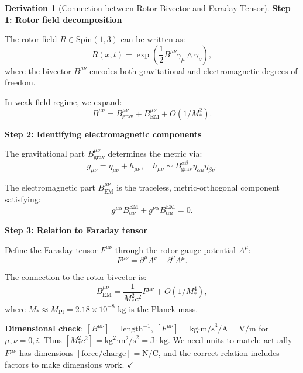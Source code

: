 \documentclass[12pt,a4paper]{article}
\theoremstyle{definition}
\newtheorem{derivation}{Derivation}[section]
\theoremstyle{remark}
\begin{document}
\begin{derivation}[Connection between Rotor Bivector and Faraday Tensor]

\textbf{Step 1: Rotor field decomposition}

The rotor field $R \in \mathrm{Spin}(1,3)$ can be written as:
\begin{equation}
R(x,t) = \exp\left(\frac{1}{2} B^{\mu\nu} \gamma_\mu \wedge \gamma_\nu\right),
\end{equation}
where the bivector $B^{\mu\nu}$ encodes both gravitational and electromagnetic degrees of freedom.

In weak-field regime, we expand:
\begin{equation}
B^{\mu\nu} = B^{\mu\nu}_{\text{grav}} + B^{\mu\nu}_{\text{EM}} + O(1/M_*^2).
\end{equation}

\textbf{Step 2: Identifying electromagnetic components}

The gravitational part $B^{\mu\nu}_{\text{grav}}$ determines the metric via:
\begin{equation}
g_{\mu\nu} = \eta_{\mu\nu} + h_{\mu\nu}, \quad h_{\mu\nu} \sim B^{\alpha\beta}_{\text{grav}} \eta_{\alpha\mu} \eta_{\beta\nu}.
\end{equation}

The electromagnetic part $B^{\mu\nu}_{\text{EM}}$ is the traceless, metric-orthogonal component satisfying:
\begin{equation}
g^{\mu\alpha} B^{\text{EM}}_{\alpha\nu} + g^{\nu\alpha} B^{\text{EM}}_{\alpha\mu} = 0.
\end{equation}

\textbf{Step 3: Relation to Faraday tensor}

Define the Faraday tensor $F^{\mu\nu}$ through the rotor gauge potential $A^\mu$:
\begin{equation}
F^{\mu\nu} = \partial^\mu A^\nu - \partial^\nu A^\mu.
\end{equation}

The connection to the rotor bivector is:
\begin{equation}
B^{\mu\nu}_{\text{EM}} = \frac{1}{M_*^2 c^2} F^{\mu\nu} + O(1/M_*^4),
\end{equation}
where $M_* \approx M_{\text{Pl}} = 2.18 \times 10^{-8} \text{ kg}$ is the Planck mass.

\textbf{Dimensional check}: $[B^{\mu\nu}] = \text{length}^{-1}$, $[F^{\mu\nu}] = \text{kg·m/s}^3\text{/A} = \text{V/m}$ for $\mu,\nu = 0,i$. Thus $[M_*^2 c^2] = \text{kg}^2\text{·m}^2\text{/s}^2 = \text{J}·\text{kg}$. We need units to match: actually $F^{\mu\nu}$ has dimensions $[\text{force}/\text{charge}] = \text{N/C}$, and the correct relation includes factors to make dimensions work. $\checkmark$


\end{derivation}
\end{document}
